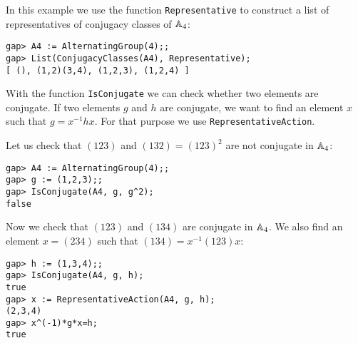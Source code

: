 \begin{example}
\label{exa:Representative}
In this example we use the function \lstinline{Representative} to construct a
list of representatives of conjugacy classes of $\mathbb{A}_4$:
\begin{lstlisting}
gap> A4 := AlternatingGroup(4);;
gap> List(ConjugacyClasses(A4), Representative);
[ (), (1,2)(3,4), (1,2,3), (1,2,4) ]
\end{lstlisting}
\end{example}

With the function \lstinline{IsConjugate} we can check whether two elements are
conjugate.  If two elements $g$ and $h$ are conjugate, we want to find an
element $x$ such that $g=x^{-1}hx$. For that purpose we use
\lstinline{RepresentativeAction}.

\begin{example}
\label{exa:RepresentativeAction}
Let us check that $(123)$ and $(132)=(123)^2$ are not conjugate in $\mathbb{A}_4$: 
\begin{lstlisting}
gap> A4 := AlternatingGroup(4);;
gap> g := (1,2,3);;
gap> IsConjugate(A4, g, g^2);
false
\end{lstlisting}
Now we check that $(123)$ and $(134)$ are conjugate in $\mathbb{A}_4$. We also find an element 
$x=(234)$ such that $(134)=x^{-1}(123)x$:
\begin{lstlisting}
gap> h := (1,3,4);;
gap> IsConjugate(A4, g, h);
true
gap> x := RepresentativeAction(A4, g, h);
(2,3,4)
gap> x^(-1)*g*x=h;
true
\end{lstlisting}
\end{example}


